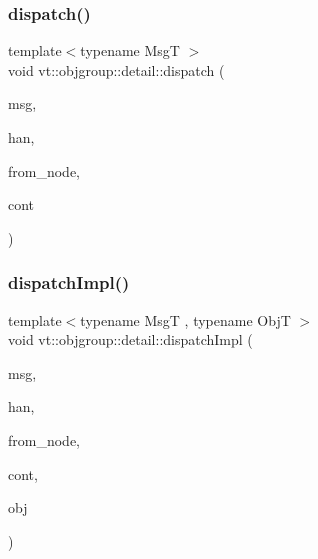 \subsubsection{\texorpdfstring{dispatch()}{dispatch()}}
{\footnotesize\ttfamily template$<$typename MsgT $>$ \\
void vt\+::objgroup\+::detail\+::dispatch (\begin{DoxyParamCaption}\item[{\hyperlink{namespacevt_ab2b3d506ec8e8d1540aede826d84a239}{Msg\+Shared\+Ptr}$<$ MsgT $>$}]{msg,  }\item[{\hyperlink{namespacevt_af64846b57dfcaf104da3ef6967917573}{Handler\+Type}}]{han,  }\item[{\hyperlink{namespacevt_a866da9d0efc19c0a1ce79e9e492f47e2}{Node\+Type}}]{from\+\_\+node,  }\item[{\hyperlink{namespacevt_ae0a5a7b18cc99d7b732cb4d44f46b0f3}{Action\+Type}}]{cont }\end{DoxyParamCaption})}

\mbox{\label{namespacevt_1_1objgroup_1_1detail_af0051871ce5fab12ba4d290c70d55537}} 
\subsubsection{\texorpdfstring{dispatch\+Impl()}{dispatchImpl()}}
{\footnotesize\ttfamily template$<$typename MsgT , typename ObjT $>$ \\
void vt\+::objgroup\+::detail\+::dispatch\+Impl (\begin{DoxyParamCaption}\item[{\hyperlink{namespacevt_ab2b3d506ec8e8d1540aede826d84a239}{Msg\+Shared\+Ptr}$<$ MsgT $>$ const \&}]{msg,  }\item[{\hyperlink{namespacevt_af64846b57dfcaf104da3ef6967917573}{Handler\+Type}}]{han,  }\item[{\hyperlink{namespacevt_a866da9d0efc19c0a1ce79e9e492f47e2}{Node\+Type}}]{from\+\_\+node,  }\item[{\hyperlink{namespacevt_ae0a5a7b18cc99d7b732cb4d44f46b0f3}{Action\+Type}}]{cont,  }\item[{ObjT $\ast$}]{obj }\end{DoxyParamCaption})}

\mbox{\label{namespacevt_1_1objgroup_1_1detail_a8f4e9c94566b84be869adfeca53fc784}} 
